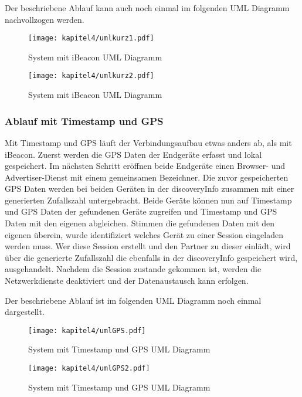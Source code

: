 Der beschriebene Ablauf kann auch noch einmal im folgenden UML Diagramm nachvollzogen werden.

\begin{figure}[H]
    \centering
    \texttt{[image: kapitel4/umlkurz1.pdf]}
    \label{umlBecon1}
    \caption{System mit iBeacon UML Diagramm}
\end{figure}
\begin{figure}[H]
    \centering
    \texttt{[image: kapitel4/umlkurz2.pdf]}
    \label{umlBecon2}
    \caption{System mit iBeacon UML Diagramm}
\end{figure}

\subsubsection{Ablauf mit Timestamp und GPS}
Mit Timestamp und \ac{GPS} läuft der Verbindungsaufbau etwas anders ab, als mit iBeacon. Zuerst werden die \ac{GPS} Daten der Endgeräte erfasst und lokal gespeichert. Im nächsten Schritt eröffnen beide Endgeräte einen Browser- und Advertiser-Dienst mit einem gemeinsamen Bezeichner. Die zuvor gespeicherten \ac{GPS} Daten werden bei beiden Geräten in der discoveryInfo zusammen mit einer generierten Zufallszahl untergebracht. Beide Geräte können nun auf Timestamp und \ac{GPS} Daten der gefundenen Geräte zugreifen und Timestamp und \ac{GPS} Daten mit den eigenen abgleichen. Stimmen die gefundenen Daten mit den eigenen überein, wurde identifiziert welches Gerät zu einer Session eingeladen werden muss. Wer diese Session erstellt und den Partner zu dieser einlädt, wird über die generierte Zufallszahl die ebenfalls in der discoveryInfo gespeichert wird, ausgehandelt. Nachdem die Session zustande gekommen ist, werden die Netzwerkdienste deaktiviert und der Datenaustausch kann erfolgen.

Der beschriebene Ablauf ist im folgenden UML Diagramm noch einmal dargestellt.

\begin{figure}[H]
    \centering
    \texttt{[image: kapitel4/umlGPS.pdf]}
    \label{umlGPS1}
    \caption{System mit Timestamp und GPS UML Diagramm}
\end{figure}
\begin{figure}[H]
    \centering
    \texttt{[image: kapitel4/umlGPS2.pdf]}
    \label{umlGPS2}
    \caption{System mit Timestamp und GPS UML Diagramm}
\end{figure}

